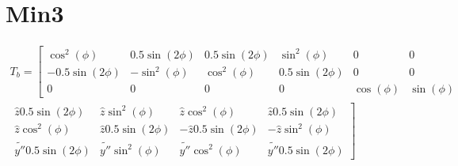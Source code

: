 
\section{Min3}
\setcounter{MaxMatrixCols}{20}

\begin{multline*}
T_b = \left[ \begin{matrix}
\cos^2(\phi) & 0.5 \sin(2 \phi) & 0.5 \sin(2 \phi) & \sin^2(\phi) & 0 & 0 \\ 
-0.5 \sin(2 \phi) & -\sin^2(\phi) & \cos^2(\phi) & 0.5 \sin(2 \phi) & 0 & 0 \\ 
0 & 0 & 0 & 0 & \cos(\phi) & \sin(\phi) 
\end{matrix} \right. \\
\left. \begin{matrix}
\hat{z} 0.5 \sin(2 \phi) & \hat{z} \sin^2(\phi) & \hat{z} \cos^2(\phi) & \hat{z} 0.5 \sin(2 \phi) \\
\hat{z} \cos^2(\phi) & \hat{z} 0.5 \sin(2 \phi) & -\hat{z} 0.5 \sin(2 \phi) & -\hat{z} \sin^2(\phi) \\
\tilde{y''} 0.5 \sin(2 \phi) & \tilde{y''} \sin^2(\phi) & \tilde{y''} \cos^2(\phi) & \tilde{y''} 0.5 \sin(2 \phi)
\end{matrix} \right]
\end{multline*}

